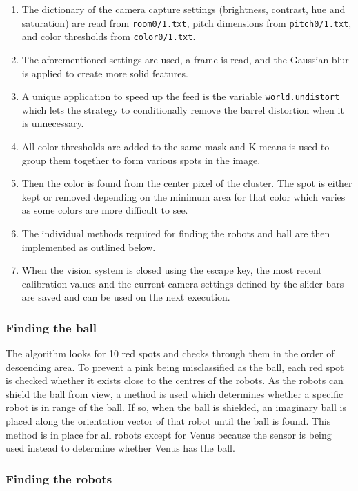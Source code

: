 \documentclass[a4paper,12pt]{article}
\begin{document}
\begin{enumerate}
\item The dictionary of the camera capture settings (brightness, contrast, hue and saturation) are read from \texttt{room0/1.txt}, pitch dimensions from \texttt{pitch0/1.txt}, and color thresholds from \texttt{color0/1.txt}.
\item The aforementioned settings are used, a frame is read, and the Gaussian blur is applied to create more solid features.
\item A unique application to speed up the feed is the variable \texttt{world.undistort} which lets the strategy to conditionally remove the barrel distortion when it is unnecessary.
\item All color thresholds are added to the same mask and K-means is used to group them together to form various spots in the image.
\item Then the color is found from the center pixel of the cluster. The spot is either kept or removed depending on the minimum area for that color which varies as some colors are more difficult to see.
\item The individual methods required for finding the robots and ball are then implemented as outlined below.
\item When the vision system is closed using the escape key, the most recent calibration values and the current camera settings defined by the slider bars are saved and can be used on the next execution.
\end{enumerate}

\subsubsection{Finding the ball}

The algorithm looks for 10 red spots and checks through them in the order of descending area. To prevent a pink being misclassified as the ball, each red spot is checked whether it exists close to the centres of the robots. As the robots can shield the ball from view, a method is used which determines whether a specific robot is in range of the ball. If so, when the ball is shielded, an imaginary ball is placed along the orientation vector of that robot until the ball is found. This method is in place for all robots except for Venus because the sensor is being used instead to determine whether Venus has the ball.

\subsubsection{Finding the robots}
\end{document}
